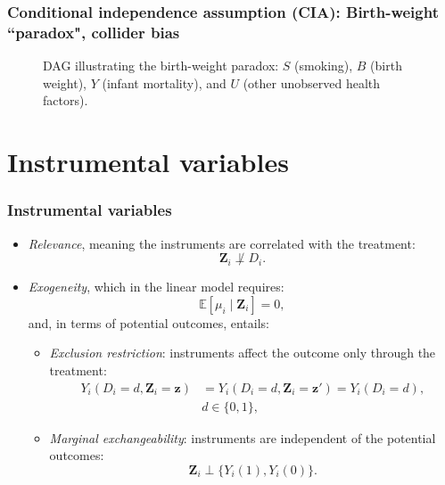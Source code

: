 \documentclass[12pt, compress]{beamer}
\begin{document}
\begin{frame}
	\frametitle{Conditional independence assumption (CIA): Birth-weight ``paradox", collider bias}
\begin{figure}[h!]
	\centering
	\caption{DAG illustrating the birth-weight paradox: $S$ (smoking), $B$ (birth weight), $Y$ (infant mortality), and $U$ (other unobserved health factors).}
	\label{fig:coll}
\end{figure}	
\end{frame}

\section{Instrumental variables}

\begin{frame}
	\frametitle{Instrumental variables}
\begin{itemize}
	\item \textit{Relevance}, meaning the instruments are correlated with the treatment:
	\[
	\mathbf{Z}_i \not\perp D_i.
	\]
	\item \textit{Exogeneity}, which in the linear model requires:
	\begin{equation*}
		\mathbb{E}[\mu_i \mid \mathbf{Z}_i] = 0,
	\end{equation*}
	and, in terms of potential outcomes, entails:
	\begin{itemize}
		\item \textit{Exclusion restriction}: instruments affect the outcome only through the treatment:
		\begin{align*}
		    Y_i(D_i = d, \mathbf{Z}_i = \mathbf{z}) & = Y_i(D_i = d, \mathbf{Z}_i = \mathbf{z}') = Y_i(D_i = d),\\
            &d \in \{0,1\},
		\end{align*}
			
		\item \textit{Marginal exchangeability}: instruments are independent of the potential outcomes:
		\[
		\mathbf{Z}_i \perp \{ Y_i(1), Y_i(0) \}.
		\]
	\end{itemize}
\end{itemize}

\end{frame}
\end{document}
